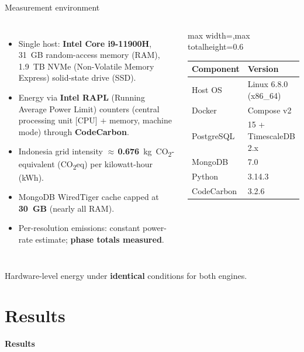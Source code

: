\documentclass[aspectratio=169, table]{beamer}
\newcommand{\sectionframe}[1]{%
  \begin{frame}{\hfill}
    \centering
    \Huge{\textbf{#1}}
  \end{frame}
}
\newcommand{\takeaway}[1]{%
  \vspace{3pt}
  {\footnotesize #1}
}
\newenvironment{fittable}[1][0.66]
  {\begin{center}\arrayrulecolor{black}\footnotesize
   \begin{adjustbox}{max width=\linewidth,max totalheight=#1\textheight}}
  {\end{adjustbox}\end{center}}
\begin{document}
\begin{frame}{Measurement environment}
  \vspace{2pt}
  \footnotesize
  \begin{columns}[t]
    \begin{itemize}\setlength{\itemsep}{2.5pt}
      \item Single host: \textbf{Intel Core i9-11900H}, 31~GB random-access memory (RAM), 1.9~TB NVMe (Non-Volatile Memory Express) solid-state drive (SSD).
      \item Energy via \textbf{Intel RAPL} (Running Average Power Limit) counters (central processing unit [CPU] $+$ memory, machine mode) through \textbf{CodeCarbon}.
      \item Indonesia grid intensity $\approx$\,\textbf{0.676}~kg~CO\textsubscript{2}-equivalent (CO\textsubscript{2}eq) per kilowatt-hour (kWh).
      \item MongoDB WiredTiger cache capped at \textbf{30~GB} (nearly all RAM).
      \item Per-resolution emissions: constant power-rate estimate; \textbf{phase totals measured}.
    \end{itemize}
    \begin{fittable}[0.6]
    \begin{tabular}{ll}
      \toprule
      \textbf{Component} & \textbf{Version} \\
      \midrule
      Host OS    & Linux 6.8.0 (x86\_64) \\
      Docker     & Compose v2 \\
      PostgreSQL & 15 + TimescaleDB 2.x \\
      MongoDB    & 7.0 \\
      Python     & 3.14.3 \\
      CodeCarbon & 3.2.6 \\
      \bottomrule
    \end{tabular}
    \end{fittable}
  \end{columns}
  \takeaway{Hardware-level energy under \textbf{identical} conditions for both engines.}
\end{frame}

\section{Results}
\sectionframe{Results}
\end{document}
